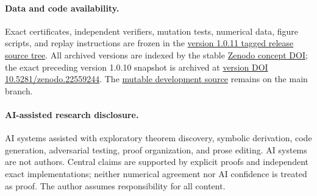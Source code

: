 \documentclass[11pt]{article}
\theoremstyle{definition}
\newcommand{\1}{\mathbf 1}
\begin{document}
\paragraph{Data and code availability.}
Exact certificates, independent verifiers, mutation tests, numerical data,
figure scripts, and replay instructions are frozen in the
\href{https://github.com/AlecKriebel/Math/tree/maximally-collective-stable-turing-v1.0.11/maximally_collective_stable_turing_patterns_binary_complex_mass_action_networks}{version 1.0.11 tagged release source tree}.
All archived versions are indexed by the stable
\href{https://doi.org/10.5281/zenodo.21753404}{Zenodo concept DOI}; the exact
preceding version 1.0.10 snapshot is archived at
\href{https://doi.org/10.5281/zenodo.22559244}{version DOI 10.5281/zenodo.22559244}.
The \href{https://github.com/AlecKriebel/Math/tree/main/maximally_collective_stable_turing_patterns_binary_complex_mass_action_networks}{mutable development source} remains on the main branch.

\paragraph{AI-assisted research disclosure.}
AI systems assisted with exploratory theorem discovery, symbolic derivation,
code generation, adversarial testing, proof organization, and prose editing.
AI systems are not authors.  Central claims are supported by explicit proofs
and independent exact implementations; neither numerical agreement nor AI
confidence is treated as proof.  The author assumes responsibility for all
content.

\begingroup
\renewcommand*{\bibfont}{\footnotesize}
\sloppy
\printbibliography
\endgroup
\end{document}
